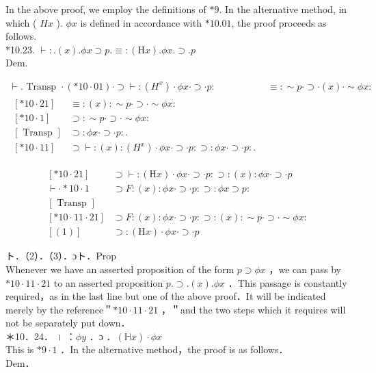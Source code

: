 \documentclass[10pt]{article}
\begin{document}
In the above proof, we employ the definitions of $* 9$. In the alternative method, in which ( $H x$ ). $\phi x$ is defined in accordance with $* 10.01$, the proof proceeds as follows.\\
*10.23. $\vdash: .(x) . \phi x \supset p . \equiv:(\mathrm{H} x) . \phi x . \supset . p$\\
Dem.

\[
\begin{array}{lr}
\vdash . \text { Transp } \cdot(* 10 \cdot 01) \cdot \supset \vdash:\left(H^{x}\right) \cdot \phi x \cdot \supset \cdot p: & \equiv: \sim p \cdot \supset \cdot(x) \cdot \sim \phi x: \\
\begin{array}{ll}
{[* 10 \cdot 21]} & \equiv:(x): \sim p \cdot \supset \cdot \sim \phi x: \\
{[* 10 \cdot 1]} & \supset: \sim p \cdot \supset \cdot \sim \phi x: \\
{[\text { Transp }]} & \supset: \phi x \cdot \supset \cdot p: . \\
{[* 10 \cdot 11]} & \supset \vdash:(x):\left(H^{x}\right) \cdot \phi x \cdot \supset \cdot p: \supset: \phi x \cdot \supset \cdot p: .
\end{array} \tag{1}
\end{array}
\]

$$
\begin{array}{ll}
{[* 10 \cdot 21]} & \supset \vdash:(\mathrm{H} x) \cdot \phi x \cdot \supset \cdot p: \supset:(x): \phi x \cdot \supset \cdot p \\
\vdash \cdot * 10 \cdot 1 & \supset F:(x): \phi x \cdot \supset \cdot p: \supset: \phi x \supset p: \\
{[\text { Transp }]} & \\
{[* 10 \cdot 11 \cdot 21]} & \supset F:(x): \phi x \cdot \supset \cdot p: \supset:(x): \sim p \cdot \supset \cdot \sim \phi x: \\
{[(1)]} & \supset:(\mathrm{H} x) \cdot \phi x \cdot \supset \cdot p
\end{array}
$$

ト．（2）．（3）．ɔト．Prop\\
Whenever we have an asserted proposition of the form $p \supset \phi x$ ，we can pass by $* 10 \cdot 11 \cdot 21$ to an asserted proposition $p . \supset .(x) . \phi x$ ．This passage is constantly required，as in the last line but one of the above proof．It will be indicated merely by the reference＂$* 10 \cdot 11 \cdot 21$ ，＂and the two steps which it requires will not be separately put down．\\
＊10．24． । ：$\phi y$ ．ɔ ．$(\mathbb{H} x) \cdot \phi x$\\
This is $* 9 \cdot 1$ ．In the alternative method，the proof is as follows．\\
Dem．
\end{document}
